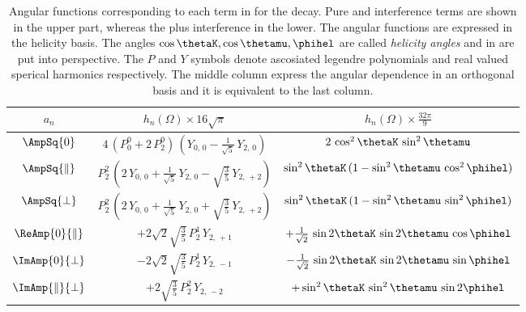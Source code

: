 \begin{table}[h]
  \centering 
  \caption{ Angular functions corresponding to each term in  for the \BJpsiKst decay. Pure and interference \pwave terms are shown in the upper part, 
    whereas the \swave plus \spwave interference in the lower. The angular functions are expressed in the helicity basis. The angles $\cos\thetaK,\cos\thetamu,\phihel$
    are called \emph{helicity angles} and in  are put into perspective. The $P$ and $Y$ symbols denote ascosiated legendre polynomials and real valued sperical harmonics
    respectively. The middle column express the angular dependence in an orthogonal basis and it is equivalent to the last column. }
  \renewcommand{\arraystretch}{1.2}
  \label{ang_distr}
  \begin{tabular}{ccc}
    \hline
    $a_n$                             &
      $h_n(\Omega) \times 16\sqrt{\pi}$      &
      $h_n(\Omega) \times \tfrac{32\pi}{9}$  \\

    \hline
    $\AmpSq{0}$  &
      $4\, (P_0^0 + 2\, P_2^0)\, (Y_{0,\,0} - \tfrac{1}{\sqrt{5}}\, Y_{2,\,0})$  &
      $2\, \cos^2\thetaK\, \sin^2\thetamu$  \\

    $\AmpSq{\parallel}$  &
      $P_2^2\, (2\, Y_{0,\,0} + \tfrac{1}{\sqrt{5}}\, Y_{2,\,0} - \sqrt{\tfrac{3}{5}}\, Y_{2,\,+2})$  &
      $\sin^2\thetaK\, (1 - \sin^2\thetamu\, \cos^2\phihel)$  \\

    $\AmpSq{\perp}$  &
      $P_2^2\, (2\, Y_{0,\,0} + \tfrac{1}{\sqrt{5}}\, Y_{2,\,0} + \sqrt{\tfrac{3}{5}}\, Y_{2,\,+2})$  &
      $\sin^2\thetaK\, (1 - \sin^2\thetamu\, \sin^2\phihel)$  \\

    $\ReAmp{0}{\parallel}$  &
      $+2\sqrt{2}\sqrt{\tfrac{3}{5}}\, P_2^1\, Y_{2,\,+1}$  &
      $+\frac{1}{\sqrt{2}}\, \sin2\thetaK\, \sin2\thetamu\, \cos\phihel$  \\

    $\ImAmp{0}{\perp}$  &
      $-2\sqrt{2}\sqrt{\tfrac{3}{5}}\, P_2^1\, Y_{2,\,-1}$  &
      $-\frac{1}{\sqrt{2}}\, \sin2\thetaK\, \sin2\thetamu\, \sin\phihel$  \\


    $\ImAmp{\parallel}{\perp}$  &
      $+2\sqrt{\tfrac{3}{5}}\, P_2^2\, Y_{2,\,-2}$  &
      $+\sin^2\thetaK\, \sin^2\thetamu\, \sin2\phihel$  \\


\end{tabular}
\end{table}
